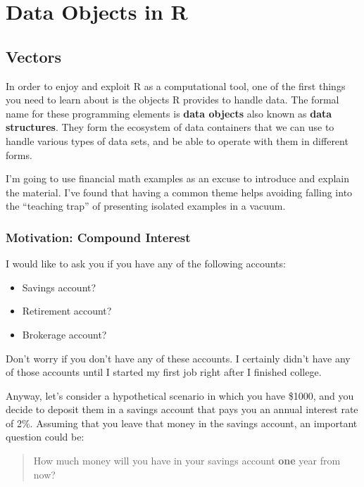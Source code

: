\documentclass[
]{book}
\begin{document}
\hypertarget{part-data-objects-in-r}{%
\part{Data Objects in R}\label{part-data-objects-in-r}}

\hypertarget{vectors}{%
\chapter{Vectors}\label{vectors}}

In order to enjoy and exploit R as a computational tool, one of the first
things you need to learn about is the objects R provides to handle data.
The formal name for these programming elements is \textbf{data objects} also known as
\textbf{data structures}. They form the ecosystem of data containers that we can use
to handle various types of data sets, and be able to operate with them in
different forms.

I'm going to use financial math examples as an excuse to introduce and explain
the material. I've found that having a common theme helps avoiding falling
into the ``teaching trap'' of presenting isolated examples in a vacuum.

\hypertarget{motivation-compound-interest}{%
\section{Motivation: Compound Interest}\label{motivation-compound-interest}}

I would like to ask you if you have any of the following accounts:

\begin{itemize}
\item
  Savings account?
\item
  Retirement account?
\item
  Brokerage account?
\end{itemize}

Don't worry if you don't have any of these accounts. I certainly didn't have
any of those accounts until I started my first job right after I finished college.

Anyway, let's consider a hypothetical scenario in which you have \$1000, and
you decide to deposit them in a savings account that pays you an annual
interest rate of 2\%. Assuming that you leave that money in the savings account,
an important question could be:

\begin{quote}
How much money will you have in your savings account \textbf{one} year from now?
\end{quote}
\end{document}
